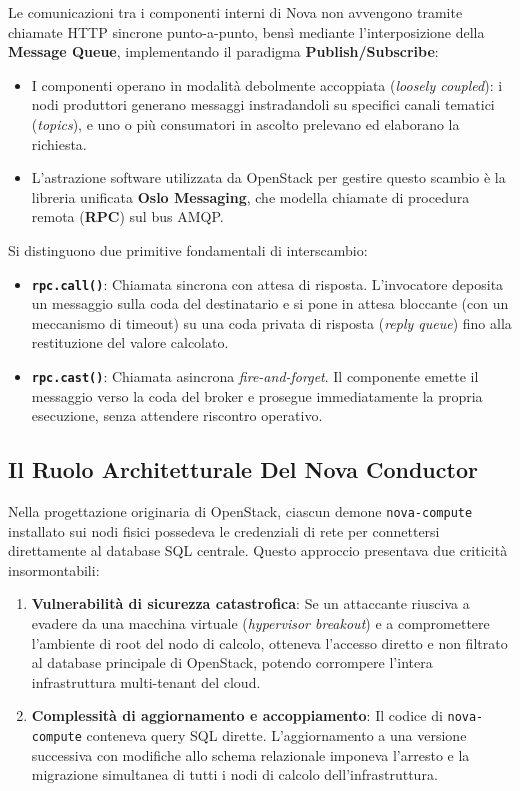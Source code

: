 \documentclass[11pt, a4paper]{article}
\begin{document}
Le comunicazioni tra i componenti interni di Nova non avvengono tramite chiamate HTTP sincrone punto-a-punto, bensì mediante l'interposizione della \textbf{Message Queue}, implementando il paradigma \textbf{Publish/Subscribe}:
\begin{itemize}[noitemsep]
    \item I componenti operano in modalità debolmente accoppiata (\emph{loosely coupled}): i nodi produttori generano messaggi instradandoli su specifici canali tematici (\emph{topics}), e uno o più consumatori in ascolto prelevano ed elaborano la richiesta.
    \item L'astrazione software utilizzata da OpenStack per gestire questo scambio è la libreria unificata \textbf{Oslo Messaging}, che modella chiamate di procedura remota (\textbf{RPC}) sul bus AMQP.
\end{itemize}

Si distinguono due primitive fondamentali di interscambio:
\begin{itemize}
    \item \textbf{\texttt{rpc.call()}}: Chiamata sincrona con attesa di risposta. L'invocatore deposita un messaggio sulla coda del destinatario e si pone in attesa bloccante (con un meccanismo di timeout) su una coda privata di risposta (\emph{reply queue}) fino alla restituzione del valore calcolato.
    \item \textbf{\texttt{rpc.cast()}}: Chiamata asincrona \emph{fire-and-forget}. Il componente emette il messaggio verso la coda del broker e prosegue immediatamente la propria esecuzione, senza attendere riscontro operativo.
\end{itemize}

\subsection{Il Ruolo Architetturale Del Nova Conductor}

Nella progettazione originaria di OpenStack, ciascun demone \texttt{nova-compute} installato sui nodi fisici possedeva le credenziali di rete per connettersi direttamente al database SQL centrale. Questo approccio presentava due criticità insormontabili:
\begin{enumerate}
    \item \textbf{Vulnerabilità di sicurezza catastrofica}: Se un attaccante riusciva a evadere da una macchina virtuale (\emph{hypervisor breakout}) e a compromettere l'ambiente di root del nodo di calcolo, otteneva l'accesso diretto e non filtrato al database principale di OpenStack, potendo corrompere l'intera infrastruttura multi-tenant del cloud.
    \item \textbf{Complessità di aggiornamento e accoppiamento}: Il codice di \texttt{nova-compute} conteneva query SQL dirette. L'aggiornamento a una versione successiva con modifiche allo schema relazionale imponeva l'arresto e la migrazione simultanea di tutti i nodi di calcolo dell'infrastruttura.
\end{enumerate}
\end{document}
